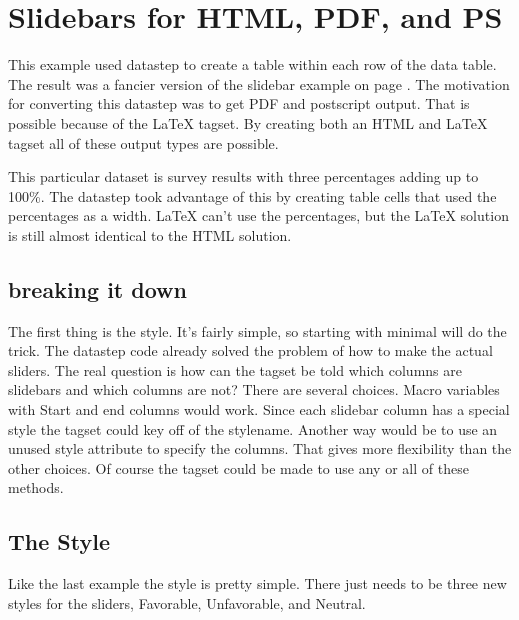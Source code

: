 
\section{Slidebars for HTML, PDF, and PS}
This example used datastep to create a table within each row of the data table.  The result
was a fancier version of the slidebar example on page \pageref{slidebars}.  The motivation
for converting this datastep was to get PDF and postscript output.  That is possible because
of the LaTeX tagset.  By creating both an HTML and LaTeX tagset all of these output types
are possible.  

This particular dataset is survey results with three percentages adding up to 100\%.  The
datastep took advantage of this by creating table cells that used the percentages as
a width.  LaTeX can't use the percentages, but the LaTeX solution is still almost 
identical to the HTML solution.

\subsection{breaking it down}
The first thing is the style.  It's fairly simple, so starting with minimal will do
the trick.  The datastep code already solved the problem of how to make the actual sliders.
The real question is how can the tagset be told which columns are slidebars and which 
columns are not?   There are several choices.  Macro variables with Start and end columns
would work.  Since each slidebar column has a special style the tagset could key off of
the stylename.  Another way would be to use an unused style attribute to specify the 
columns.  That gives more flexibility than the other choices.  Of course the tagset could
be made to use any or all of these methods.

\subsection{The Style}
Like the last example the style is pretty simple.  There just needs to be three new styles
for the sliders, Favorable, Unfavorable, and Neutral.
 
